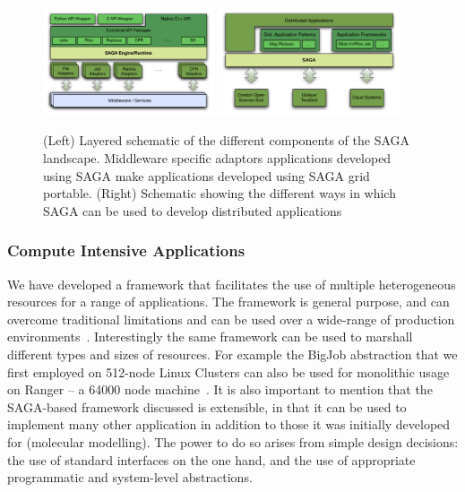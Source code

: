 \documentclass[10pt,letterpaper]{article}
\newcommand{\up}{\vspace*{-0.25em}}
\begin{document}
\begin{figure}[!ht]
  \up\up
  \begin{center}
      \includegraphics[width=0.45\textwidth]{../figures/stci_saga_figures-1.pdf}
      \includegraphics[width=0.48\textwidth]{../figures/stci_saga_figures.pdf}
  \end{center}
  \up\up\up\up\up\up\up\up\up\up
  \caption{\small (Left) Layered schematic of the different components
    of the SAGA landscape.  Middleware specific adaptors applications
    developed using SAGA make applications developed using SAGA grid
    portable. (Right) Schematic showing the different ways in which
    SAGA can be used to develop distributed applications}
 \label{sagalayer}
\end{figure}

\subsubsection*{Compute Intensive Applications}

We have developed a framework that facilitates the use of multiple heterogeneous resources for a range of applications. The framework is general purpose, and can overcome traditional limitations and can be used over a wide-range of production environments~\cite{saga_royalsoc}. Interestingly the same framework can be used to marshall different types and sizes of resources. For example the BigJob abstraction that we first employed on 512-node Linux Clusters can also be used for monolithic usage on Ranger -- a 64000 node machine~\cite{saga_iccs09}. It is also important to mention that the SAGA-based framework discussed is extensible, in that it can be used to implement many other application in addition to those it was initially developed for (molecular modelling). The power to do so arises from simple design decisions: the use of standard interfaces on the one hand, and the use of appropriate programmatic and system-level abstractions.
\end{document}
